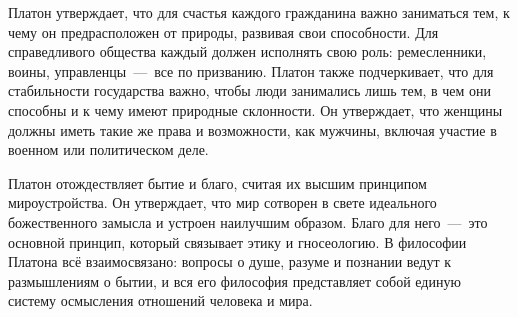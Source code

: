 Платон утверждает, что для счастья каждого гражданина важно заниматься тем, к чему он предрасположен от природы, развивая свои способности. Для справедливого общества каждый должен исполнять свою роль: ремесленники, воины, управленцы~---~все по призванию. Платон также подчеркивает, что для стабильности государства важно, чтобы люди занимались лишь тем, в чем они способны и к чему имеют природные склонности. Он утверждает, что женщины должны иметь такие же права и возможности, как мужчины, включая участие в военном или политическом деле.


Платон отождествляет бытие и благо, считая их высшим принципом мироустройства. Он утверждает, что мир сотворен в свете идеального божественного замысла и устроен наилучшим образом. Благо для него~---~это основной принцип, который связывает этику и гносеологию. В философии Платона всё взаимосвязано: вопросы о душе, разуме и познании ведут к размышлениям о бытии, и вся его философия представляет собой единую систему осмысления отношений человека и мира.

